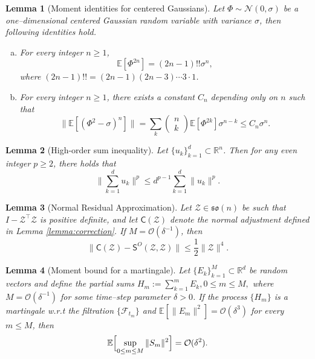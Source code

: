 \documentclass[11pt, a4paper, onecolumn]{article}
\newcommand{\E}{\mathbb{E}}
\newcommand{\SSO}{\nm S^{O}}
\newcommand{\Z}{\mathcal{Z}}
\newcommand{\tg}[1]{\mathcal{#1}}
\newcommand{\nm}[1]{\mathsf{#1}}
\newcommand{\half}{{\frac{1}{2}}}
\newtheorem{lemma}{Lemma}
\begin{document}
\begin{appendices}
\begin{lemma}[Moment identities for centered Gaussians]\label{lemma:gauss-moments}
Let $\Phi\sim\mathcal N(0,\sigma)$ be a one–dimensional centered Gaussian random variable with variance $\sigma$, then following identities hold.
\begin{enumerate}[(a)]
    \item For every integer $n\ge 1$,
          \[
              \E[\Phi^{2n}] = (2n-1)!!\sigma^{n},
          \]
          where $(2n-1)!!=(2n-1)(2n-3)\cdots3\cdot1$.
    \item For every integer $n\ge 1$, there exists a constant $C_n$ depending only on $n$ such that
          \[
              \bigl\|\E[(\Phi^{2}-\sigma)^{n}]\bigr\| = \sum_k \begin{pmatrix}
                  n \\ k
              \end{pmatrix}\E[\Phi^{2k}]\sigma^{n-k}\le C_n\sigma^{n}.
          \]
\end{enumerate}
\end{lemma}

\begin{lemma}[High-order sum inequality]\label{lemma:high-ord-sum}
Let $\{u_k\}_{k=1}^d \subset \mathbb{R}^n$.  Then for any even integer $p \ge 2$, there holds that
\[
   \Big\| \sum_{k=1}^{d} u_k \Big\|^p \le d^{p-1} \sum_{k=1}^{d} \|u_k\|^p.
\]
\end{lemma}

\begin{lemma}[Normal Residual Approximation\cite{wang2025tangent}]\label{lemma:normal-error}
Let $\tg Z\in\mathfrak{so}(n)$ be such that $I-\tg Z^{\top}\tg Z$ is positive definite, and let $\nm C(\tg Z)$ denote the normal adjustment defined in Lemma \ref{lemma:correction}. If $M=\mathcal O(\delta^{-1})$, then
\[
\|\nm C(\Z)- \SSO(\Z,\Z)\| \le \half\|\Z\|^4.
\]
\end{lemma}

\begin{lemma}[Moment bound for a martingale]\label{lemma:error-sum-mar} Let $\{E_k\}_{k=1}^{M}\subset\mathbb{R}^{d}$ be random vectors and define the partial sums $ H_m := \sum_{k=1}^{m} E_k,  0 \le m \le M,$ where $M = \mathcal{O}(\delta^{-1})$ for some time–step parameter $\delta > 0$. If the process $\{H_m\}$ is a martingale w.r.t the filtration $\{\mathcal F_{t_m}\}$ and $\E[\|E_m\|^{2}] = \mathcal{O}(\delta^{3})$ for every $m\le M$, then
\[
    \E\Bigl[\sup_{0\le m\le M} \|S_m\|^{2}\Bigr] 
    = \mathcal{O}(\delta^{2}).
\]
\end{lemma}


\end{appendices}
\end{document}
